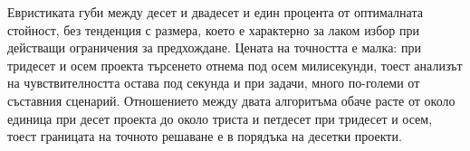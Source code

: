 Евристиката губи между десет и двадесет и един процента от оптималната стойност,
без тенденция с размера, което е характерно за лаком избор при действащи
ограничения за предхождане. Цената на точността е малка: при тридесет и осем
проекта търсенето отнема под осем милисекунди, тоест анализът на чувствителността
остава под секунда и при задачи, много по-големи от съставния сценарий.
Отношението между двата алгоритъма обаче расте от около единица при десет проекта
до около триста и петдесет при тридесет и осем, тоест границата на точното
решаване е в порядъка на десетки проекти.
